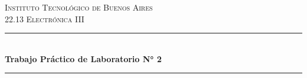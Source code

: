 \begin{titlepage}
    
    \newcommand{\HRule}{\rule{\linewidth}{0.5mm}} %
        
    \center %
         
        
    \textsc{\LARGE Instituto Tecnológico de Buenos Aires}\\[2cm] %
    \textsc{\Large 22.13 Electrónica III}\\[1.5cm] %
        
        
    \HRule \\[0.5cm]
    { \huge \bfseries Trabajo Práctico de Laboratorio N° 2}\\[0.4cm] %
    \HRule \\[2cm]
         
        

\end{titlepage}
